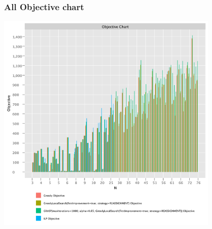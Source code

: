 \documentclass{beamer}
\begin{document}
\begin{frame}
\frametitle{All Objective chart}
\includegraphics[width=0.8\textwidth]{./documentation/assets/all.objectiveChart.pdf}
\end{frame}
\end{document}
